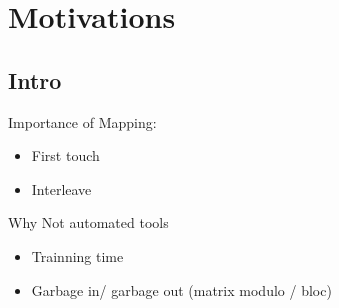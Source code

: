 \section{Motivations}
\label{sec:motivations}

\subsection{Intro}
\label{sec:motivations-intro}

Importance of Mapping:
\begin{itemize}
    \item First touch
    \item Interleave
\end{itemize}

Why Not automated tools
\begin{itemize}
    \item Trainning time
    \item Garbage in/ garbage out (matrix modulo / bloc)
\end{itemize}
